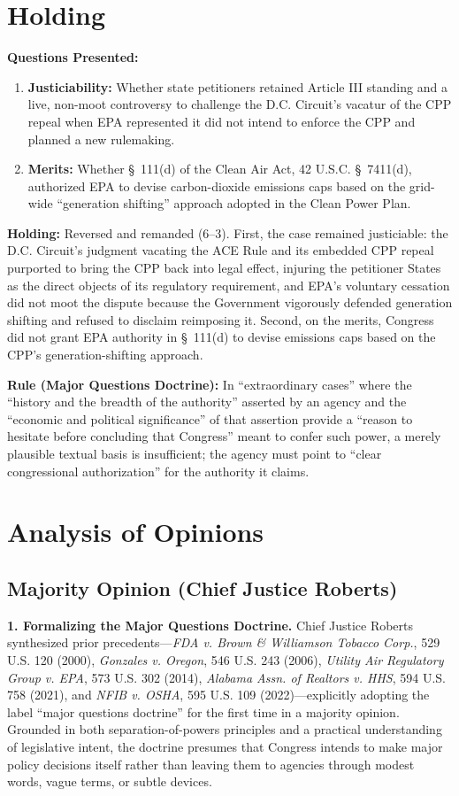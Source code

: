 \documentclass[12pt]{article}
\begin{document}
\section{Holding}
\textbf{Questions Presented:}

\begin{enumerate}
  \item \textbf{Justiciability:} Whether state petitioners retained Article III standing and a live, non-moot controversy to challenge the D.C. Circuit's vacatur of the CPP repeal when EPA represented it did not intend to enforce the CPP and planned a new rulemaking.
  \item \textbf{Merits:} Whether \S~111(d) of the Clean Air Act, 42 U.S.C. \S~7411(d), authorized EPA to devise carbon-dioxide emissions caps based on the grid-wide ``generation shifting'' approach adopted in the Clean Power Plan.
\end{enumerate}

\textbf{Holding:} Reversed and remanded (6--3). First, the case remained justiciable: the D.C. Circuit's judgment vacating the ACE Rule and its embedded CPP repeal purported to bring the CPP back into legal effect, injuring the petitioner States as the direct objects of its regulatory requirement, and EPA's voluntary cessation did not moot the dispute because the Government vigorously defended generation shifting and refused to disclaim reimposing it. Second, on the merits, Congress did not grant EPA authority in \S~111(d) to devise emissions caps based on the CPP's generation-shifting approach.

\textbf{Rule (Major Questions Doctrine):} In ``extraordinary cases'' where the ``history and the breadth of the authority'' asserted by an agency and the ``economic and political significance'' of that assertion provide a ``reason to hesitate before concluding that Congress'' meant to confer such power, a merely plausible textual basis is insufficient; the agency must point to ``clear congressional authorization'' for the authority it claims.

\section{Analysis of Opinions}
\subsection{Majority Opinion (Chief Justice Roberts)}

\textbf{1. Formalizing the Major Questions Doctrine.} Chief Justice Roberts synthesized prior precedents---\textit{FDA v. Brown \& Williamson Tobacco Corp.}, 529 U.S. 120 (2000), \textit{Gonzales v. Oregon}, 546 U.S. 243 (2006), \textit{Utility Air Regulatory Group v. EPA}, 573 U.S. 302 (2014), \textit{Alabama Assn. of Realtors v. HHS}, 594 U.S. 758 (2021), and \textit{NFIB v. OSHA}, 595 U.S. 109 (2022)---explicitly adopting the label ``major questions doctrine'' for the first time in a majority opinion. Grounded in both separation-of-powers principles and a practical understanding of legislative intent, the doctrine presumes that Congress intends to make major policy decisions itself rather than leaving them to agencies through modest words, vague terms, or subtle devices.
\end{document}
